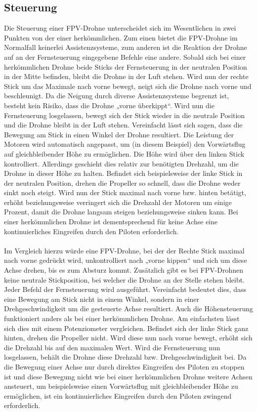     \newpage
    \subsection[Steuerung]{Steuerung}
        Die Steuerung einer FPV-Drohne unterscheidet sich im Wesentlichen in zwei Punkten von der einer herkömmlichen. Zum einen bietet die FPV-Drohne im Normalfall keinerlei Assistenzsysteme, zum anderen ist die Reaktion der Drohne auf an der Fernsteuerung eingegebene Befehle eine andere. Sobald sich bei einer herkömmlichen Drohne beide Sticks der Fernsteuerung in der neutralen Position in der Mitte befinden, bleibt die Drohne in der Luft stehen. Wird nun der rechte Stick um das Maximale nach vorne bewegt, neigt sich die Drohne nach vorne und beschleunigt. Da die Neigung durch diverse Assistenzsysteme begrenzt ist, besteht kein Risiko, dass die Drohne „vorne überkippt“. Wird nun die Fernsteuerung losgelassen, bewegt sich der Stick wieder in die neutrale Position und die Drohne bleibt in der Luft stehen. Vereinfacht lässt sich sagen, dass die Bewegung am Stick in einen Winkel der Drohne resultiert. Die Leistung der Motoren wird automatisch angepasst, um (in diesem Beispiel) den Vorwärtsflug auf gleichbleibender Höhe zu ermöglichen. Die Höhe wird über den linken Stick kontrolliert. Allerdings geschieht dies relativ zur benötigten Drehzahl, um die Drohne in dieser Höhe zu halten. Befindet sich beispielsweise der linke Stick in der neutralen Position, drehen die Propeller so schnell, dass die Drohne weder sinkt noch steigt. Wird nun der Stick maximal nach vorne bzw. hinten betätigt, erhöht beziehungsweise verringert sich die Drehzahl der Motoren um einige Prozent, damit die Drohne langsam steigen beziehungsweise sinken kann. Bei einer herkömmlichen Drohne ist dementsprechend für keine Achse eine kontinuierliches Eingreifen durch den Piloten erforderlich.
        \\ \\
        Im Vergleich hierzu würde eine FPV-Drohne, bei der der Rechte Stick maximal nach vorne gedrückt wird, unkontrolliert nach „vorne kippen“ und sich um diese Achse drehen, bis es zum Absturz kommt. Zusätzlich gibt es bei FPV-Drohnen keine neutrale Stickposition, bei welcher die Drohne an der Stelle stehen bleibt. Jeder Befehl der Fernsteuerung wird ausgeführt. Vereinfacht bedeutet dies, dass eine Bewegung am Stick nicht in einem Winkel, sondern in einer Drehgeschwindigkeit um die gesteuerte Achse resultiert. Auch die Höhensteuerung funktioniert anders als bei einer herkömmlichen Drohne. Am einfachsten lässt sich dies mit einem Potenziometer vergleichen. Befindet sich der linke Stick ganz hinten, drehen die Propeller nicht. Wird diese nun nach vorne bewegt, erhöht sich die Drehzahl bis auf den maximalen Wert. Wird die Fernsteuerung nun losgelassen, behält die Drohne diese Drehzahl bzw. Drehgeschwindigkeit bei. Da die Bewegung einer Achse nur durch direktes Eingreifen des Piloten zu stoppen ist und diese Bewegung nicht wie bei einer herkömmlichen Drohne weitere Achsen ansteuert, um beispielsweise einen Vorwärtsflug mit gleichbleibender Höhe zu ermöglichen, ist ein kontinuierliches Eingreifen durch den Piloten zwingend erforderlich.

